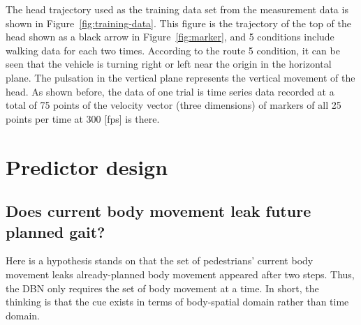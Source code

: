 \documentclass{sigchi}
\begin{document}
The head trajectory used as the training data set from the measurement data is shown in Figure~\ref{fig:training-data}. This figure is the trajectory of the top of the head shown as a black arrow in Figure~\ref{fig:marker}, and 5 conditions include walking data for each two times. According to the route 5 condition, it can be seen that the vehicle is turning right or left near the origin in the horizontal plane. The pulsation in the vertical plane represents the vertical movement of the head. As shown before, the data of one trial is time series data recorded at a total of 75 points of the velocity vector (three dimensions) of markers of all 25 points per time at 300 [fps] is there.



\section{Predictor design}%

\subsection{Does current body movement leak future planned gait?}

Here is a hypothesis stands on that the set of pedestrians' current body movement leaks already-planned body movement appeared after two steps. Thus, the DBN only requires the set of body movement at a time. In short, the thinking is that the cue exists in terms of body-spatial domain rather than time domain. 
\end{document}
